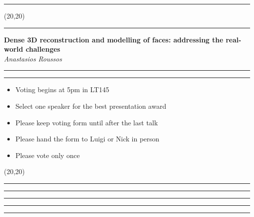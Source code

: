 \documentclass[11pt]{article}
\newcommand{\talk}[1]{\Large\flushleft\textbf{#1}\\}
\newcommand{\speaker}[1]{\textit{#1}\\}
\newcommand{\separator}{\noindent\rule{\linewidth}{0.1mm}}
\newcommand{\votebox}{\vspace{-5cm}\noindent\hfill\framebox(20,20){}}
\newcommand{\hstrut}{\noindent\color{iclightblue}\rule{\linewidth}{0pt}}
\begin{document}
\begin{minipage}[b]{0.02\linewidth}
\hstrut%
\end{minipage}
\begin{minipage}[b]{0.49\linewidth}
\votebox%
\end{minipage}
\noindent
\begin{minipage}[t]{0.49\linewidth}
\separator%
\talk{Dense 3D reconstruction and modelling of faces: addressing the real-world
      challenges}
\speaker{Anastasios Roussos}
\end{minipage}
\begin{minipage}[t]{0.02\linewidth}
\hstrut%
\end{minipage}
\begin{minipage}[t]{0.49\linewidth}
\separator%

{\it
\begin{itemize}
  \item Voting begins at 5pm in LT145
  \item Select one speaker for the best presentation award
  \item Please keep voting form until after the last talk
  \item Please hand the form to Luigi or Nick in person
  \item Please vote only once
\end{itemize}
}
\end{minipage}
\vfill
\noindent
\begin{minipage}[b]{0.49\linewidth}
\votebox%
\end{minipage}
\begin{minipage}[b]{0.02\linewidth}
\hstrut%
\end{minipage}
\begin{minipage}[b]{0.49\linewidth}
\hstrut%
\end{minipage}
\noindent
\begin{minipage}[t]{0.49\linewidth}
\separator%
\vfill
\end{minipage}
\begin{minipage}[t]{0.02\linewidth}
\hstrut%
\end{minipage}
\begin{minipage}[t]{0.49\linewidth}
\hstrut%
\end{minipage}
\end{document}
